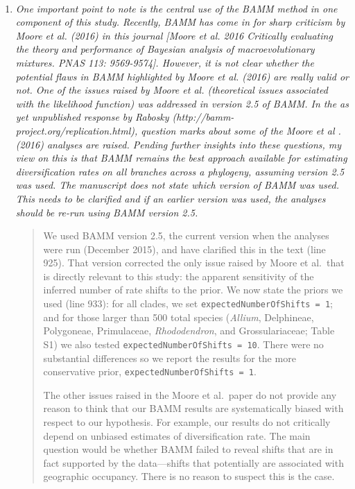 \documentclass[11pt]{letter}
\begin{document}
\begin{letter}{ \\

}
\begin{enumerate}
  \begin{quote}
    We have added references to Donoghue \& Sanderson (2015) and
    Bouchenak-Khelladi et al.\ (2015), and clarified our point about
    \textit{Pedicularis} (lines 316, 318).
  \end{quote}

\item \textit{One important point to note is the central use of the
    BAMM method in one component of this study. Recently, BAMM has
    come in for sharp criticism by Moore et al. (2016) in this journal
    [Moore et al. 2016 Critically evaluating the theory and
    performance of Bayesian analysis of macroevolutionary
    mixtures. PNAS 113: 9569-9574]. However, it is not clear whether
    the potential flaws in BAMM highlighted by Moore et al. (2016) are
    really valid or not. One of the issues raised by Moore et
    al. (theoretical issues associated with the likelihood function)
    was addressed in version 2.5 of BAMM.  In the as yet unpublished
    response by Rabosky (http://bamm-project.org/replication.html),
    question marks about some of the Moore et al .(2016) analyses are
    raised.  Pending further insights into these questions, my view on
    this is that BAMM remains the best approach available for
    estimating diversification rates on all branches across a
    phylogeny, assuming version 2.5 was used. The manuscript does not
    state which version of BAMM was used. This needs to be clarified
    and if an earlier version was used, the analyses should be re-run
    using BAMM version 2.5.}

  \begin{quote}
    We used BAMM version 2.5, the current version when the analyses
    were run (December 2015), and have clarified this in the text
    (line 925). That version corrected the only issue raised by Moore
    et al.\ that is directly relevant to this study: the apparent
    sensitivity of the inferred number of rate shifts to the prior. We
    now state the priors we used (line 933): for all clades, we set
    \texttt{expectedNumberOfShifts = 1}; and for those larger than 500
    total species (\textit{Allium}, Delphineae, Polygoneae,
    Primulaceae, \textit{Rhododendron}, and Grossulariaceae; Table S1)
    we also tested \texttt{expectedNumberOfShifts = 10}. There were no
    substantial differences so we report the results for the more
    conservative prior, \texttt{expectedNumberOfShifts = 1}.

    The other issues raised in the Moore et al.\ paper do not provide
    any reason to think that our BAMM results are systematically
    biased with respect to our hypothesis. For example, our results do
    not critically depend on unbiased estimates of diversification
    rate. The main question would be whether BAMM failed to reveal
    shifts that are in fact supported by the data---shifts that
    potentially are associated with geographic occupancy. There is no
    reason to suspect this is the case.


\end{quote}
\end{enumerate}
\end{letter}
\end{document}
